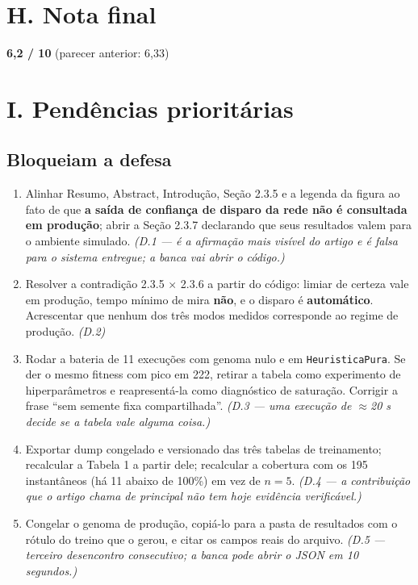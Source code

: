 \documentclass[11pt,a4paper]{article}
\begin{document}
\section*{H. Nota final}

\begin{center}
\Large\textbf{6,2 / 10} \quad\normalsize (parecer anterior: 6,33)
\end{center}

\section*{I. Pendências prioritárias}

\subsection*{Bloqueiam a defesa}

\begin{enumerate}
  \item Alinhar Resumo, Abstract, Introdução, Seção 2.3.5 e a legenda da figura ao fato de que
  \textbf{a saída de confiança de disparo da rede não é consultada em produção}; abrir a Seção 2.3.7
  declarando que seus resultados valem para o ambiente simulado. \emph{(D.1 --- é a afirmação mais
  visível do artigo e é falsa para o sistema entregue; a banca vai abrir o código.)}

  \item Resolver a contradição 2.3.5 $\times$ 2.3.6 a partir do código: limiar de certeza vale em
  produção, tempo mínimo de mira \textbf{não}, e o disparo é \textbf{automático}. Acrescentar que
  nenhum dos três modos medidos corresponde ao regime de produção. \emph{(D.2)}

  \item Rodar a bateria de 11 execuções com genoma nulo e em \texttt{HeuristicaPura}. Se der o mesmo
  fitness com pico em 222, retirar a tabela como experimento de hiperparâmetros e reapresentá-la como
  diagnóstico de saturação. Corrigir a frase ``sem semente fixa compartilhada''. \emph{(D.3 --- uma
  execução de $\approx$20 s decide se a tabela vale alguma coisa.)}

  \item Exportar dump congelado e versionado das três tabelas de treinamento; recalcular a Tabela 1 a
  partir dele; recalcular a cobertura com os 195 instantâneos (há 11 abaixo de 100\%) em vez de $n=5$.
  \emph{(D.4 --- a contribuição que o artigo chama de principal não tem hoje evidência verificável.)}

  \item Congelar o genoma de produção, copiá-lo para a pasta de resultados com o rótulo do treino que
  o gerou, e citar os campos reais do arquivo. \emph{(D.5 --- terceiro desencontro consecutivo; a
  banca pode abrir o JSON em 10 segundos.)}
\end{enumerate}
\end{document}
